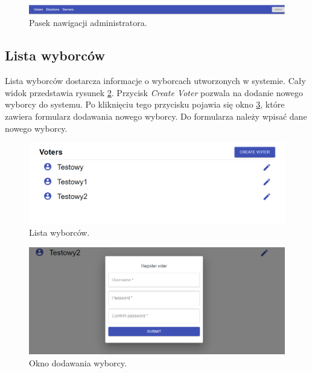 \documentclass[a4paper,12pt]{book}
\begin{document}
\begin{figure}[h]
	\centering
	\includegraphics[width=\textwidth]{images/adminnav.png}
	\caption{Pasek nawigacji administratora.}\label{adminnav}
\end {figure}

\newpage

\subsection{Lista wyborców}

Lista wyborców dostarcza informacje o wyborcach utworzonych w systemie. Cały widok przedstawia rysunek \ref{voterslist}. Przycisk \textit{Create Voter} pozwala na dodanie nowego wyborcy do systemu. Po kliknięciu tego przycisku pojawia się okno \ref{addvoter}, które zawiera formularz dodawania nowego wyborcy. Do formularza należy wpisać dane nowego wyborcy.

\begin{figure}[h]
	\centering
	\includegraphics[width=\textwidth]{images/voterslist.png}
	\caption{Lista wyborców.}\label{voterslist}
\end {figure}

\begin{figure}[h]
	\centering
	\includegraphics[width=\textwidth]{images/addvoter.png}
	\caption{Okno dodawania wyborcy.}\label{addvoter}
\end {figure}
\end{document}
